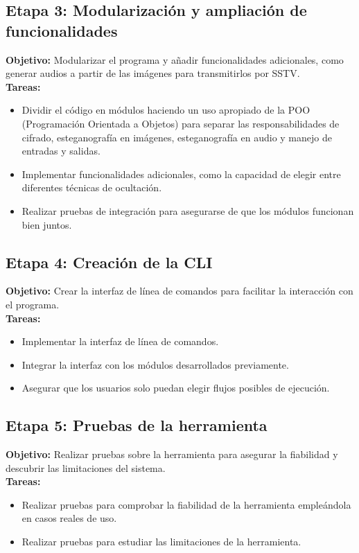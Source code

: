 \subsection{Etapa 3: Modularización y ampliación de funcionalidades}
\label{subsec:3}
\textbf{Objetivo:} Modularizar el programa y añadir funcionalidades adicionales, como generar audios a partir de las imágenes para transmitirlos por SSTV.\\

\textbf{Tareas:}
\begin{itemize}
    \item Dividir el código en módulos haciendo un uso apropiado de la POO (Programación Orientada a Objetos) para separar las responsabilidades de cifrado, esteganografía en imágenes, esteganografía en audio y manejo de entradas y salidas.
    \item Implementar funcionalidades adicionales, como la capacidad de elegir entre diferentes técnicas de ocultación.
    \item Realizar pruebas de integración para asegurarse de que los módulos funcionan bien juntos.
\end{itemize}

\subsection{Etapa 4: Creación de la CLI}
\label{subsec:4}
\textbf{Objetivo:} Crear la interfaz de línea de comandos para facilitar la interacción con el programa.\\

\textbf{Tareas:}
\begin{itemize}
    \item Implementar la interfaz de línea de comandos.
    \item Integrar la interfaz con los módulos desarrollados previamente.
    \item Asegurar que los usuarios solo puedan elegir flujos posibles de ejecución.
\end{itemize}

\subsection{Etapa 5: Pruebas de la herramienta}
\label{subsec:5}
\textbf{Objetivo:} Realizar pruebas sobre la herramienta para asegurar la fiabilidad y descubrir las limitaciones del sistema.\\

\textbf{Tareas:}
\begin{itemize}
    \item Realizar pruebas para comprobar la fiabilidad de la herramienta empleándola en casos reales de uso.
    \item Realizar pruebas para estudiar las limitaciones de la herramienta.
\end{itemize}


